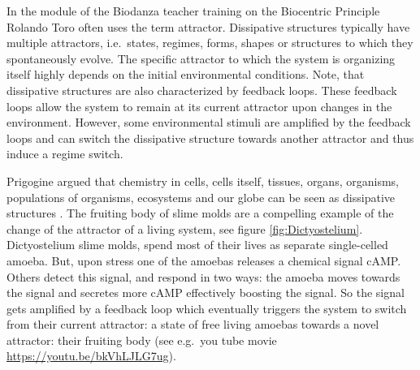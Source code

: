 \documentclass[
  11pt,
]{book}
\begin{document}
In the module of the Biodanza teacher training on the Biocentric Principle Rolando Toro often uses the term attractor. Dissipative structures typically have multiple attractors, i.e.~states, regimes, forms, shapes or structures to which they spontaneously evolve. The specific attractor to which the system is organizing itself highly depends on the initial environmental conditions.
Note, that dissipative structures are also characterized by feedback loops.
These feedback loops allow the system to remain at its current attractor upon changes in the environment.
However, some environmental stimuli are amplified by the feedback loops and can switch the dissipative structure towards another attractor and thus induce a regime switch.

Prigogine argued that chemistry in cells, cells itself, tissues, organs, organisms, populations of organisms, ecosystems and our globe can be seen as dissipative structures \citep{prigogineStengers1984}.
The fruiting body of slime molds are a compelling example of the change of the attractor of a living system, see figure \ref{fig:Dictyostelium}. Dictyostelium slime molds, spend most of their lives as separate single-celled amoeba. But, upon stress one of the amoebas releases a chemical signal cAMP. Others detect this signal, and respond in two ways: the amoeba moves towards the signal and secretes more cAMP effectively boosting the signal. So the signal gets amplified by a feedback loop which eventually triggers the system to switch from their current attractor: a state of free living amoebas towards a novel attractor: their fruiting body (see e.g.~you tube movie \url{https://youtu.be/bkVhLJLG7ug}).
\end{document}
